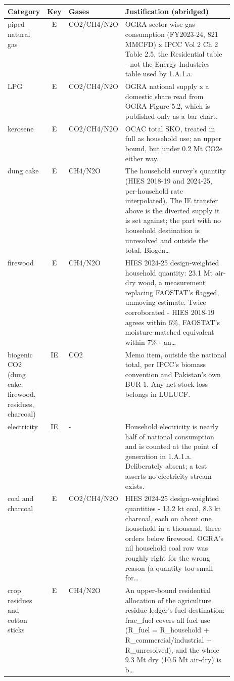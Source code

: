 \begin{table}[htbp]
\centering
\scriptsize
\begin{tabular}{@{}lclp{0.52\linewidth}@{}}
\toprule
\textbf{Category} & \textbf{Key} & \textbf{Gases} & \textbf{Justification (abridged)} \\
\midrule
piped natural gas & E & CO2/CH4/N2O & OGRA sector-wise gas consumption (FY2023-24, 821 MMCFD) x IPCC Vol 2 Ch 2 Table 2.5, the Residential table - not the Energy Industries table used by 1.A.1.a. \\[2pt]
LPG & E & CO2/CH4/N2O & OGRA national supply x a domestic share read from OGRA Figure 5.2, which is published only as a bar chart. \\[2pt]
kerosene & E & CO2/CH4/N2O & OCAC total SKO, treated in full as household use; an upper bound, but under 0.2 Mt CO2e either way. \\[2pt]
dung cake & E & CH4/N2O & The household survey's quantity (HIES 2018-19 and 2024-25, per-household rate interpolated). The IE transfer above is the diverted supply it is set against; the part with no household destination is unresolved and outside the total. Biogen\ldots \\[2pt]
firewood & E & CH4/N2O & HIES 2024-25 design-weighted household quantity: 23.1 Mt air-dry wood, a measurement replacing FAOSTAT's flagged, unmoving estimate. Twice corroborated - HIES 2018-19 agrees within 6\%, FAOSTAT's moisture-matched equivalent within 7\% - an\ldots \\[2pt]
biogenic CO2 (dung cake, firewood, residues, charcoal) & IE & CO2 & Memo item, outside the national total, per IPCC's biomass convention and Pakistan's own BUR-1. Any net stock loss belongs in LULUCF. \\[2pt]
electricity & IE & - & Household electricity is nearly half of national consumption and is counted at the point of generation in 1.A.1.a. Deliberately absent; a test asserts no electricity stream exists. \\[2pt]
coal and charcoal & E & CO2/CH4/N2O & HIES 2024-25 design-weighted quantities - 13.2 kt coal, 8.3 kt charcoal, each on about one household in a thousand, three orders below firewood. OGRA's nil household coal row was roughly right for the wrong reason (a quantity too small for\ldots \\[2pt]
crop residues and cotton sticks & E & CH4/N2O & An upper-bound residential allocation of the agriculture residue ledger's fuel destination: frac\_fuel covers all fuel use (R\_fuel = R\_household + R\_commercial/industrial + R\_unresolved), and the whole 9.3 Mt dry (10.5 Mt air-dry) is b\ldots \\[2pt]

\end{tabular}
\end{table}
